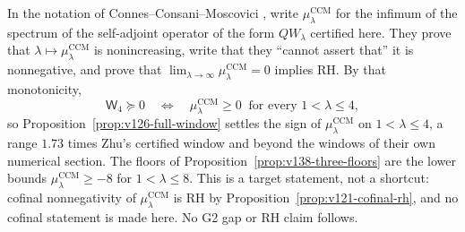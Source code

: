 In the notation of Connes--Consani--Moscovici
\cite[Corollaries~3.7--3.8]{ConnesConsaniMoscovici2025}, write
$\mu^{\mathrm{CCM}}_\lambda$ for the infimum of the spectrum of the
self-adjoint operator of the form $QW_\lambda$ certified here. They
prove that $\lambda\mapsto\mu^{\mathrm{CCM}}_\lambda$ is nonincreasing,
write that they ``cannot assert that'' it is nonnegative, and prove
that $\lim_{\lambda\to\infty}\mu^{\mathrm{CCM}}_\lambda=0$ implies RH.
By that monotonicity,
\[
 \mathsf W_4\succeq0
 \quad\Longleftrightarrow\quad
 \mu^{\mathrm{CCM}}_\lambda\ge0\ \text{ for every }1<\lambda\le4,
\]
so Proposition~\ref{prop:v126-full-window} settles the sign of
$\mu^{\mathrm{CCM}}_\lambda$ on $1<\lambda\le4$, a range $1.73$ times
Zhu's certified window and beyond the windows of their own numerical
section. The floors of Proposition~\ref{prop:v138-three-floors} are the
lower bounds $\mu^{\mathrm{CCM}}_\lambda\ge-8$ for $1<\lambda\le8$.
This is a target statement, not a shortcut: cofinal nonnegativity of
$\mu^{\mathrm{CCM}}_\lambda$ is RH by
Proposition~\ref{prop:v121-cofinal-rh}, and no cofinal statement is
made here. No G2 gap or RH claim follows.
